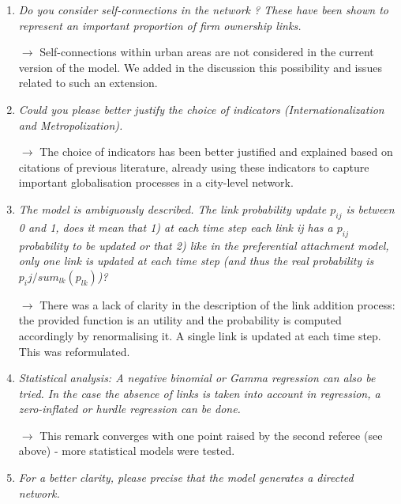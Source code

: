 \documentclass[10pt,a4paper,sans]{moderncv}
\begin{document}
\begin{enumerate}
	\item \textit{Do you consider self-connections in the network ? These have been shown to represent an important proportion of firm ownership links.}
	
	$\rightarrow$ Self-connections within urban areas are not considered in the current version of the model. We added in the discussion this possibility and issues related to such an extension.
	
	\medskip
	
	\item \textit{Could you please better justify the choice of indicators (Internationalization and Metropolization).}
	
	$\rightarrow$ The choice of indicators has been better justified and explained based on citations of previous literature, already using these indicators to capture important globalisation processes in a city-level network.
	
	\medskip



	\item \textit{The model is ambiguously described. The link probability update $p_{ij}$ is between 0 and 1, does it mean that 1) at each time step each link ij has a $p_{ij}$ probability to be updated or that 2) like in the preferential attachment model, only one link is updated at each time step (and thus the real probability is $p_ij/sum_{lk}(p_{lk})$)?}
	
	$\rightarrow$ There was a lack of clarity in the description of the link addition process: the provided function is an utility and the probability is computed accordingly by renormalising it. A single link is updated at each time step. This was reformulated.
	
	\medskip


	\item \textit{Statistical analysis: A negative binomial or Gamma regression can also be tried. In the case the absence of links is taken into account in regression, a zero-inflated or hurdle regression can be done.}
	 
	$\rightarrow$ This remark converges with one point raised by the second referee (see above) - more statistical models were tested.
	
	\medskip


	\item \textit{For a better clarity, please precise that the model generates a directed network.}


\end{enumerate}
\end{document}
